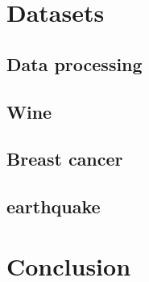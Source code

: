 \documentclass{article}
\begin{document}
\newpage
\section{Datasets}
\subsection{Data processing}
\subsection{Wine}
\subsection{Breast cancer}
\subsection{earthquake}

\section{Conclusion}

% 
\end{document}
